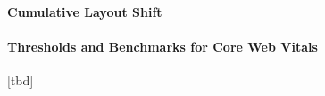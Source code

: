 \paragraph{Cumulative Layout Shift}











\paragraph{Thresholds and Benchmarks for Core Web Vitals}


[tbd]















































